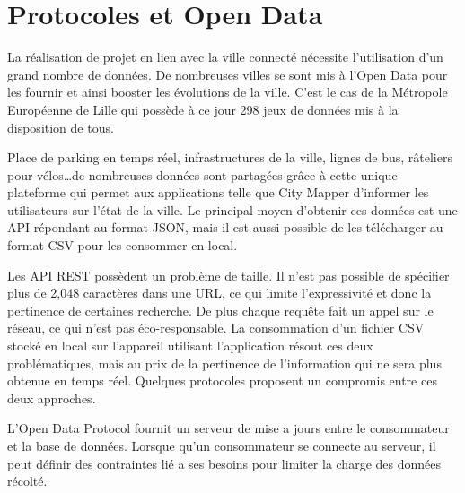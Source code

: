 




\section{Protocoles et Open Data}

La réalisation de projet en lien avec la ville connecté nécessite l'utilisation d'un grand nombre de données.
De nombreuses villes se sont mis à l'Open Data pour les fournir et ainsi booster les évolutions de la ville.
C'est le cas de la Métropole Européenne de Lille qui possède à ce jour 298 jeux de données mis à la disposition de tous.

Place de parking en temps réel, infrastructures de la ville, lignes de bus, râteliers pour vélos\dots de nombreuses
données sont partagées grâce à cette unique plateforme qui permet aux applications telle que City Mapper
d'informer les utilisateurs sur l'état de la ville.
Le principal moyen d'obtenir ces données est une API répondant au format JSON, mais il est aussi possible de les
télécharger au format CSV pour les consommer en local.

Les API REST possèdent un problème de taille. Il n'est pas possible de spécifier plus de
2,048 caractères dans une URL, ce qui limite l'expressivité et donc la pertinence de certaines recherche.
De plus chaque requête fait un appel sur le réseau, ce qui n'est pas éco-responsable.
La consommation d'un fichier CSV stocké en local sur l'appareil utilisant l'application résout ces deux problématiques,
mais au prix de la pertinence de l'information qui ne sera plus obtenue en temps réel.
Quelques protocoles proposent un compromis entre ces deux approches.

L'Open Data Protocol fournit un serveur de mise a jours entre le consommateur et la base de données.
Lorsque qu'un consommateur se connecte au serveur, il peut définir des contraintes lié a ses besoins
pour limiter la charge des données récolté.

